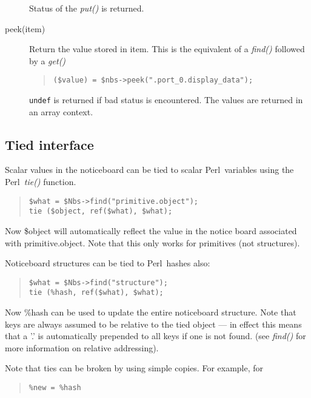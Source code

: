 \documentclass[twoside,11pt]{article}
\newenvironment{myquote}{\begin{quote}\begin{small}}{\end{small}\end{quote}}
\newcommand{\perl}{\xref{\textsf{Perl}}{sun193}{}}
\newcommand{\xref}[3]{#1}
\renewcommand{\_}{\texttt{\symbol{95}}}
\begin{document}
\begin{description}
Status of the {\em put()\/} is returned.

\item[peek(item)] \mbox{}

Return the value stored in item. This is the equivalent of a {\em find()\/}
followed by a {\em get()\/}
\begin{myquote}
\begin{verbatim}
($value) = $nbs->peek(".port_0.display_data");
\end{verbatim}
\end{myquote}

\texttt{undef} is returned if bad status is encountered.
The values are returned in an array context.

\end{description}

\subsection{Tied interface}%

Scalar values in the noticeboard can be tied to scalar \perl\ variables
using the \perl\ {\em tie()\/} function.
\begin{myquote}
\begin{verbatim}
$what = $Nbs->find("primitive.object");
tie ($object, ref($what), $what);
\end{verbatim}
\end{myquote} %

Now \$object will automatically reflect the value in the notice board
associated with primitive.object. Note that this only works for
primitives (not structures).

Noticeboard structures can be tied to \perl\ hashes also:
\begin{myquote}
\begin{verbatim}
$what = $Nbs->find("structure");
tie (%hash, ref($what), $what);
\end{verbatim}
\end{myquote}

Now \%hash can be used to update the entire noticeboard structure.
Note that keys are always assumed to be relative to the
tied object --- in effect this means that a '.' is automatically
prepended to all keys if one is not found. (see {\em find()\/}
for more information on relative addressing).

Note that ties can be broken by using simple copies.
For example, for
\begin{myquote}
\begin{verbatim}
%new = %hash
\end{verbatim}
\end{myquote}
\end{document}
